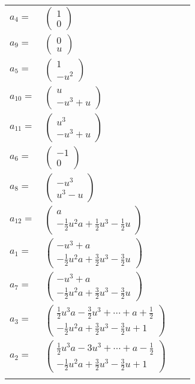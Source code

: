 \documentclass[1p]{elsarticle_modified}
\theoremstyle{definition}
\begin{document}
\begin{tabular}{m{7pt} m{180pt} m{7pt} m{180pt} }
\flushright $a_{4}=$&$\begin{pmatrix}1\\0\end{pmatrix}$ \\
\flushright $a_{9}=$&$\begin{pmatrix}0\\u\end{pmatrix}$ \\
\flushright $a_{5}=$&$\begin{pmatrix}1\\- u^2\end{pmatrix}$ \\
\flushright $a_{10}=$&$\begin{pmatrix}u\\- u^3+u\end{pmatrix}$ \\
\flushright $a_{11}=$&$\begin{pmatrix}u^3\\- u^3+u\end{pmatrix}$ \\
\flushright $a_{6}=$&$\begin{pmatrix}-1\\0\end{pmatrix}$ \\
\flushright $a_{8}=$&$\begin{pmatrix}- u^3\\u^3- u\end{pmatrix}$ \\
\flushright $a_{12}=$&$\begin{pmatrix}a\\-\frac{1}{2} u^2 a+\frac{1}{2} u^3-\frac{1}{2} u\end{pmatrix}$ \\
\flushright $a_{1}=$&$\begin{pmatrix}- u^3+a\\-\frac{1}{2} u^2 a+\frac{3}{2} u^3-\frac{3}{2} u\end{pmatrix}$ \\
\flushright $a_{7}=$&$\begin{pmatrix}- u^3+a\\-\frac{1}{2} u^2 a+\frac{3}{2} u^3-\frac{3}{2} u\end{pmatrix}$ \\
\flushright $a_{3}=$&$\begin{pmatrix}\frac{1}{2} u^3 a-\frac{3}{2} u^3+\cdots+a+\frac{1}{2}\\-\frac{1}{2} u^2 a+\frac{3}{2} u^3-\frac{3}{2} u+1\end{pmatrix}$ \\
\flushright $a_{2}=$&$\begin{pmatrix}\frac{1}{2} u^3 a-3 u^3+\cdots+a-\frac{1}{2}\\-\frac{1}{2} u^2 a+\frac{3}{2} u^3-\frac{3}{2} u+1\end{pmatrix}$\\&\end{tabular}
\end{document}
